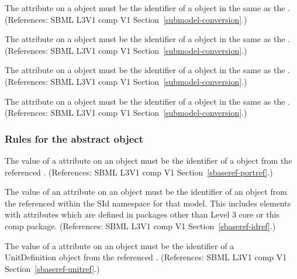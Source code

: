 \begin{sbmlenum}
 { The  attribute
   on a \Submodel object must be the identifier of a \Parameter object in the 
   same \Model as the \Submodel.
  (References: SBML L3V1 comp V1 Section~\ref{submodel-conversion}.) }


 { The  attribute
   on a \Submodel object must be the identifier of a \Parameter object in the 
   same \Model as the \Submodel.
  (References: SBML L3V1 comp V1 Section~\ref{submodel-conversion}.) }


 { The  attribute
   on a \Submodel object must be the identifier of a \Parameter object in the 
   same \Model as the \Submodel.
  (References: SBML L3V1 comp V1 Section~\ref{submodel-conversion}.) }


 { The  attribute
   on a \Submodel object must be the identifier of a \Parameter object in the 
   same \Model as the \Submodel.
  (References: SBML L3V1 comp V1 Section~\ref{submodel-conversion}.) }


\end{sbmlenum} \subsubsection*{Rules for the  abstract object} \begin{sbmlenum}

 { The value of a  attribute on an \SBaseRef
  object must be the identifier of a \Port object from the referenced
  \Model.  
  (References: SBML L3V1 comp V1 Section~\ref{sbaseref-portref}.) }


 { The value of an  attribute on an \SBaseRef
  object must be the identifier of an object from the referenced \Model
  within the SId namespace for that model.  This includes elements with
   attributes which are defined in packages other than Level 3 core or
  this comp package. 
  (References: SBML L3V1 comp V1 Section~\ref{sbaseref-idref}.) }


 { The value of a  attribute on an \SBaseRef
  object must be the identifier of a \\UnitDefinition object from the
  referenced \Model.  
  (References: SBML L3V1 comp V1 Section~\ref{sbaseref-unitref}.) }



\end{sbmlenum}
